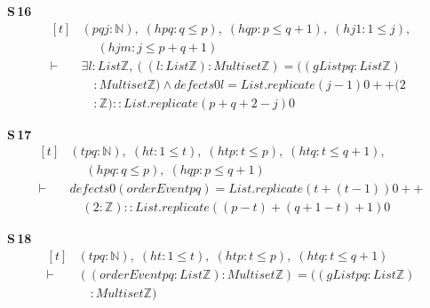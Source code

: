 \noindent\textbf{S\,16}\quad{}
{\footnotesize\[ \begin{aligned}[t]
&(\mathit{p} \mathit{q} \mathit{j} : \mathbb{N} ),\; (\mathit{hpq} : \mathit{q} \leq \mathit{p}),\; (\mathit{hqp} : \mathit{p} \leq \mathit{q} + 1),\; (\mathit{hj1} : 1 \leq \mathit{j}),\\
&\quad \; (\mathit{hjm} : \mathit{j} \leq \mathit{p} + \mathit{q} + 1)\\
\vdash\;&\exists \mathit{l} : \mathit{List} \mathbb{Z} , ((\mathit{l} : \mathit{List} \mathbb{Z} ) : \mathit{Multiset} \mathbb{Z} ) = ((\mathit{gList} \mathit{p} \mathit{q} : \mathit{List} \mathbb{Z} )\\
&\quad : \mathit{Multiset} \mathbb{Z} ) \wedge \mathit{defects} 0 \mathit{l} = \mathit{List}.\mathit{replicate} (\mathit{j} - 1) 0 ++ (2\\
&\quad : \mathbb{Z} ) :: \mathit{List}.\mathit{replicate} (\mathit{p} + \mathit{q} + 2 - \mathit{j}) 0
\end{aligned} \]}

\noindent\textbf{S\,17}\quad{}
{\footnotesize\[ \begin{aligned}[t]
&(\mathit{t} \mathit{p} \mathit{q} : \mathbb{N} ),\; (\mathit{ht} : 1 \leq \mathit{t}),\; (\mathit{htp} : \mathit{t} \leq \mathit{p}),\; (\mathit{htq} : \mathit{t} \leq \mathit{q} + 1),\\
&\quad \; (\mathit{hpq} : \mathit{q} \leq \mathit{p}),\; (\mathit{hqp} : \mathit{p} \leq \mathit{q} + 1)\\
\vdash\;&\mathit{defects} 0 (\mathit{orderEven} \mathit{t} \mathit{p} \mathit{q}) = \mathit{List}.\mathit{replicate} (\mathit{t} + (\mathit{t} - 1)) 0 ++\\
&\quad (2 : \mathbb{Z} ) :: \mathit{List}.\mathit{replicate} ((\mathit{p} - \mathit{t}) + (\mathit{q} + 1 - \mathit{t}) + 1) 0
\end{aligned} \]}

\noindent\textbf{S\,18}\quad{}
{\footnotesize\[ \begin{aligned}[t]
&(\mathit{t} \mathit{p} \mathit{q} : \mathbb{N} ),\; (\mathit{ht} : 1 \leq \mathit{t}),\; (\mathit{htp} : \mathit{t} \leq \mathit{p}),\; (\mathit{htq} : \mathit{t} \leq \mathit{q} + 1)\\
\vdash\;&((\mathit{orderEven} \mathit{t} \mathit{p} \mathit{q} : \mathit{List} \mathbb{Z} ) : \mathit{Multiset} \mathbb{Z} ) = ((\mathit{gList} \mathit{p} \mathit{q} : \mathit{List} \mathbb{Z} )\\
&\quad : \mathit{Multiset} \mathbb{Z} )
\end{aligned} \]}

